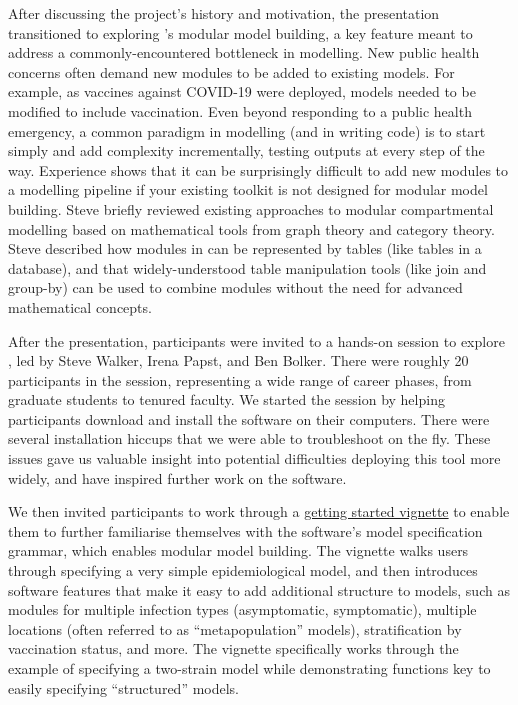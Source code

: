 After discussing the project's history and motivation, the presentation transitioned to \newline exploring \macpan's modular model building, a key feature meant to address a commonly-encountered bottleneck in modelling. New public health concerns often demand new modules to be added to existing models. For example, as vaccines against COVID-19 were deployed, models needed to be modified to include vaccination. Even beyond responding to a public health emergency, a common paradigm in modelling (and in writing code) is to start simply and add complexity incrementally, testing outputs at every step of the way. Experience shows that it can be surprisingly difficult to add new modules to a modelling pipeline if your existing toolkit is not designed for modular model building. Steve briefly reviewed existing approaches to modular compartmental modelling based on mathematical tools from graph theory and category theory. Steve described how modules in \macpan can be represented by tables (like tables in a database), and that widely-understood table manipulation tools (like join and group-by) can be used to combine modules without the need for advanced mathematical concepts.

After the presentation, participants were invited to a hands-on session to explore \newline \macpan, led by Steve Walker, Irena Papst, and Ben Bolker. There were roughly 20 participants in the session, representing a wide range of career phases, from graduate students to tenured faculty. We started the session by helping participants download and install the software on their computers. There were several installation hiccups that we were able to troubleshoot on the fly. These issues gave us valuable insight into potential difficulties deploying this tool more widely, and have inspired further work on the software.

We then invited participants to work through a \href{https://github.com/canmod/macpan2/blob/4b9812d4b05f3e959f2f84f4712d72a681b06e6c/vignettes/quickstart.Rmd}{getting started vignette} to enable them to further familiarise themselves with the software's model specification grammar, which enables modular model building. The vignette walks users through specifying a very simple epidemiological model, and then introduces software features that make it easy to add additional structure to models, such as modules for multiple infection types (\eg asymptomatic, symptomatic), multiple locations (often referred to as ``metapopulation'' models), stratification by vaccination status, and more. The vignette specifically works through the example of specifying a two-strain model while demonstrating \macpan functions key to easily specifying ``structured'' models.

